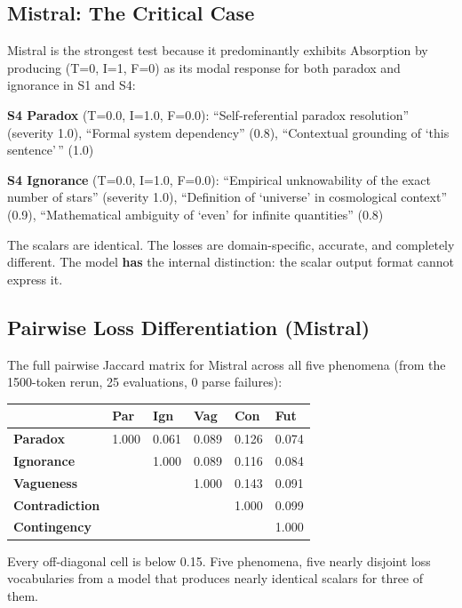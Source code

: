 \subsection{Mistral: The Critical Case}

Mistral is the strongest test because it predominantly exhibits
Absorption by producing (T=0, I=1, F=0) as its modal response for both
paradox and ignorance in S1 and S4:

\textbf{S4 Paradox} (T=0.0, I=1.0, F=0.0): ``Self-referential paradox
resolution'' (severity 1.0), ``Formal system dependency'' (0.8),
``Contextual grounding of `this sentence'\,'' (1.0)

\textbf{S4 Ignorance} (T=0.0, I=1.0, F=0.0): ``Empirical unknowability
of the exact number of stars'' (severity 1.0), ``Definition of
`universe' in cosmological context'' (0.9), ``Mathematical ambiguity of
`even' for infinite quantities'' (0.8)

The scalars are identical. The losses are domain-specific, accurate, and
completely different. The model \textbf{has} the internal distinction:
the scalar output format cannot express it.

\subsection{Pairwise Loss Differentiation (Mistral)}

The full pairwise Jaccard matrix for Mistral across all five phenomena
(from the 1500-token rerun, 25 evaluations, 0 parse failures):

\begin{longtable}[]{@{}llllll@{}}
\toprule\noalign{}
& Par & Ign & Vag & Con & Fut \\
\midrule\noalign{}
\endhead
\bottomrule\noalign{}
\endlastfoot
\textbf{Paradox} & 1.000 & 0.061 & 0.089 & 0.126 & 0.074 \\
\textbf{Ignorance} & & 1.000 & 0.089 & 0.116 & 0.084 \\
\textbf{Vagueness} & & & 1.000 & 0.143 & 0.091 \\
\textbf{Contradiction} & & & & 1.000 & 0.099 \\
\textbf{Contingency} & & & & & 1.000 \\
\end{longtable}

Every off-diagonal cell is below 0.15. Five phenomena, five nearly
disjoint loss vocabularies from a model that produces nearly identical
scalars for three of them.

